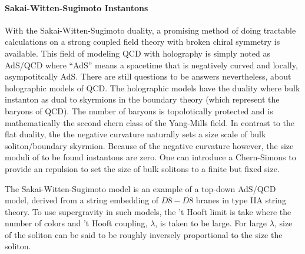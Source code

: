 \documentclass[12pt]{article}
\begin{document}
\paragraph{Sakai-Witten-Sugimoto Instantons}


With the Sakai-Witten-Sugimoto duality, a promising method of doing tractable calculations on a strong coupled field theory with broken chiral symmetry is available.
This field of modeling QCD with holography is simply noted as AdS/QCD where ``AdS'' means a spacetime that is negatively curved and locally, asympotitcally AdS.
There are still questions to be answers nevertheless, about holographic models of QCD.
The holographic models have the duality where bulk instanton as dual to skyrmions in the boundary theory (which represent the baryons of QCD).
The number of baryons is topolotically protected and is mathematically the second chern class of the Yang-Mills field.
In contrast to the flat duality, the the negative curvature naturally sets a size scale of bulk soliton/boundary skyrmion.
Because of the negative curvature however, the size moduli of to be found instantons are zero.
One can introduce a Chern-Simons to provide an repulsion to set the size of bulk solitons to a finite but fixed size.


The Sakai-Witten-Sugimoto model is an example of a top-down AdS/QCD model, derived from a string embedding of $D8-\overline{D8}$ branes in type IIA string theory.
To use supergravity in such models, the 't Hooft limit is take where the number of colors and 't Hooft coupling, $\lambda$, is taken to be large.
For large $\lambda$, size of the soliton can be said to be roughly inversely proportional to the size the soliton.
\end{document}
